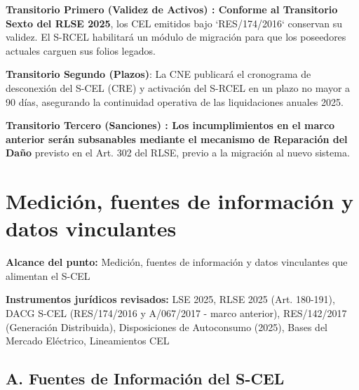 \documentclass{cel}
\begin{document}
\textbf{Transitorio Primero (Validez de Activos) \textbf{: Conforme al }Transitorio Sexto del RLSE 2025}, los CEL emitidos bajo `RES/174/2016` conservan su validez. El S-RCEL habilitará un módulo de migración para que los poseedores actuales carguen sus folios legados.


\textbf{Transitorio Segundo (Plazos)}: La CNE publicará el cronograma de desconexión del S-CEL (CRE) y activación del S-RCEL en un plazo no mayor a 90 días, asegurando la continuidad operativa de las liquidaciones anuales 2025.


\textbf{Transitorio Tercero (Sanciones) \textbf{: Los incumplimientos en el marco anterior serán subsanables mediante el mecanismo de }Reparación del Daño} previsto en el Art. 302 del RLSE, previo a la migración al nuevo sistema.


{}
\section*{Medición, fuentes de información y datos vinculantes}
\nopagebreak

\textbf{Alcance del punto:} Medición, fuentes de información y datos vinculantes que alimentan el S-CEL

\textbf{Instrumentos jurídicos revisados:} LSE 2025, RLSE 2025 (Art. 180-191), DACG S-CEL (RES/174/2016 y A/067/2017 - marco anterior), RES/142/2017 (Generación Distribuida), Disposiciones de Autoconsumo (2025), Bases del Mercado Eléctrico, Lineamientos CEL



\vspace{0.4cm}
\subsection{A. Fuentes de Información del S-CEL}
\nopagebreak
\end{document}
